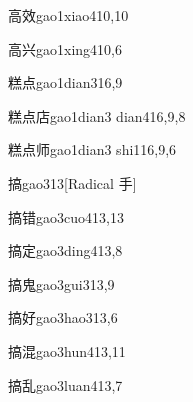 \begin{verbete}{高效}{gao1xiao4}{10,10}
\end{verbete}

\begin{verbete}{高兴}{gao1xing4}{10,6}
\end{verbete}

\begin{verbete}{糕点}{gao1dian3}{16,9}
\end{verbete}

\begin{verbete}{糕点店}{gao1dian3 dian4}{16,9,8}
\end{verbete}

\begin{verbete}{糕点师}{gao1dian3 shi1}{16,9,6}
\end{verbete}

\begin{verbete}{搞}{gao3}{13}[Radical 手]
\end{verbete}

\begin{verbete}{搞错}{gao3cuo4}{13,13}
\end{verbete}

\begin{verbete}{搞定}{gao3ding4}{13,8}
\end{verbete}

\begin{verbete}{搞鬼}{gao3gui3}{13,9}
\end{verbete}

\begin{verbete}{搞好}{gao3hao3}{13,6}
\end{verbete}

\begin{verbete}{搞混}{gao3hun4}{13,11}
\end{verbete}

\begin{verbete}{搞乱}{gao3luan4}{13,7}
\end{verbete}

